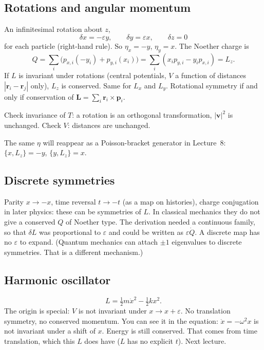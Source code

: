 \documentclass[11pt]{article}
\numberwithin{equation}{section}
\newcommand{\vect}[1]{\mathbf{#1}}
\begin{document}
\subsection{Rotations and angular momentum}

An infinitesimal rotation about $z$,
\[
\delta x = -\varepsilon y,\qquad \delta y = \varepsilon x,\qquad \delta z=0
\]
for each particle (right-hand rule). So $\eta_x=-y$, $\eta_y=x$. The Noether charge is
\[
Q = \sum_i\bigl(p_{x,i}(-y_i) + p_{y,i}(x_i)\bigr)
= \sum_i (x_i p_{y,i} - y_i p_{x,i}) = L_z.
\]
If $L$ is invariant under rotations (central potentials, $V$ a function of distances $|\vect{r}_i-\vect{r}_j|$ only), $L_z$ is conserved. Same for $L_x$ and $L_y$. Rotational symmetry if and only if conservation of $\vect{L}=\sum_i\vect{r}_i\times\vect{p}_i$.

Check invariance of $T$: a rotation is an orthogonal transformation, $|\vect{v}|^2$ is unchanged. Check $V$: distances are unchanged.

The same $\eta$ will reappear as a Poisson-bracket generator in Lecture~8: $\{x,L_z\}=-y$, $\{y,L_z\}=x$.

\subsection{Discrete symmetries}

Parity $x\to -x$, time reversal $t\to -t$ (as a map on histories), charge conjugation in later physics: these can be symmetries of $L$. In classical mechanics they do not give a conserved $Q$ of Noether type. The derivation needed a continuous family, so that $\delta L$ was proportional to $\varepsilon$ and could be written as $\varepsilon\dot Q$. A discrete map has no $\varepsilon$ to expand. (Quantum mechanics can attach $\pm 1$ eigenvalues to discrete symmetries. That is a different mechanism.)

\subsection{Harmonic oscillator}

\[
L = \tfrac12 m\dot x^2 - \tfrac12 k x^2.
\]
The origin is special: $V$ is not invariant under $x\to x+\varepsilon$. No translation symmetry, no conserved momentum. You can see it in the equation: $\ddot x=-\omega^2 x$ is not invariant under a shift of $x$. Energy is still conserved. That comes from time translation, which this $L$ does have ($L$ has no explicit $t$). Next lecture.
\end{document}
